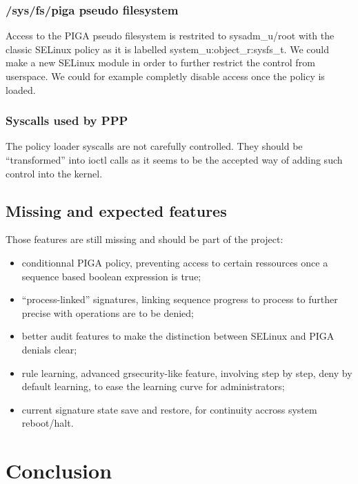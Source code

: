 \documentclass[pdftex,a4paper,titlepage,11pt]{article}
\begin{document}
\subsubsection{/sys/fs/piga pseudo filesystem}

Access to the PIGA pseudo filesystem is restrited to sysadm\_u/root with the
classic SELinux policy as it is labelled system\_u:object\_r:sysfs\_t. We could
make a new SELinux module in order to further restrict the control from
userspace. We could for example completly disable access once the policy is
loaded.

\subsubsection{Syscalls used by PPP}

The policy loader syscalls are not carefully controlled. They should be
``transformed'' into ioctl calls as it seems to be the accepted way of adding
such control into the kernel.

\subsection{Missing and expected features}

Those features are still missing and should be part of the project:

\begin{itemize}
	\item conditionnal PIGA policy, preventing access to certain ressources
once a sequence based boolean expression is true;
	\item ``process-linked'' signatures, linking sequence progress to process
to further precise with operations are to be denied;
	\item better audit features to make the distinction between SELinux and PIGA
denials clear;
	\item rule learning, advanced grsecurity-like feature, involving step by
step, deny by default learning, to ease the learning curve for administrators;
	\item current signature state save and restore, for continuity accross
system reboot/halt.
\end{itemize}

\newpage

\section*{Conclusion} 
\end{document}

